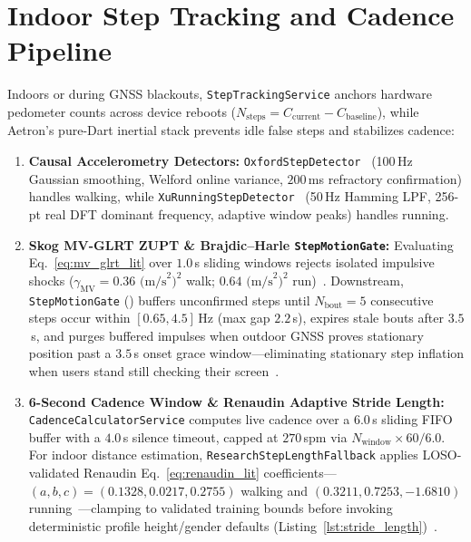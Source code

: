 \section{Indoor Step Tracking and Cadence Pipeline}
\label{sec:indoor_pipeline_design}
Indoors or during GNSS blackouts, \texttt{StepTrackingService} anchors hardware pedometer counts across device reboots ($N_{\text{steps}} = C_{\text{current}} - C_{\text{baseline}}$), while Aetron's pure-Dart inertial stack prevents idle false steps and stabilizes cadence:
\begin{enumerate}
    \item \textbf{Causal Accelerometry Detectors:} \texttt{OxfordStepDetector}~\cite{salvi2018oxford} (100\,Hz Gaussian smoothing, Welford online variance, $200$\,ms refractory confirmation) handles walking, while \texttt{XuRunningStepDetector}~\cite{xu2022step} (50\,Hz Hamming LPF, 256-pt real DFT dominant frequency, adaptive window peaks) handles running.
    \item \textbf{Skog MV-GLRT ZUPT \& Brajdic--Harle \texttt{StepMotionGate}:} Evaluating Eq.~\ref{eq:mv_glrt_lit} over $1.0$\,s sliding windows rejects isolated impulsive shocks ($\gamma_{\text{MV}} = 0.36\text{ (m/s}^2)^2$ walk; $0.64\text{ (m/s}^2)^2$ run)~\cite{skog2010zupt}. Downstream, \texttt{StepMotionGate} () buffers unconfirmed steps until $N_{\text{bout}} = 5$ consecutive steps occur within $[0.65, 4.5]$\,Hz (max gap $2.2$\,s), expires stale bouts after $3.5$\,s, and purges buffered impulses when outdoor GNSS proves stationary position past a $3.5$\,s onset grace window---eliminating stationary step inflation when users stand still checking their screen~\cite{brajdic2013walk}.
    \item \textbf{6-Second Cadence Window \& Renaudin Adaptive Stride Length:} \texttt{CadenceCalculatorService} computes live cadence over a $6.0$\,s sliding FIFO buffer with a $4.0$\,s silence timeout, capped at $270$\,spm via $N_{\text{window}}\times 60 / 6.0$. For indoor distance estimation, \texttt{ResearchStepLengthFallback} applies LOSO-validated Renaudin Eq.~\ref{eq:renaudin_lit} coefficients---$(a, b, c) = (0.1328, 0.0217, 0.2755)$ walking and $(0.3211, 0.7253, -1.6810)$ running~\cite{renaudin2012step}---clamping to validated training bounds before invoking deterministic profile height/gender defaults (Listing~\ref{lst:stride_length})~\cite{taborri2016gait}.
\end{enumerate}


